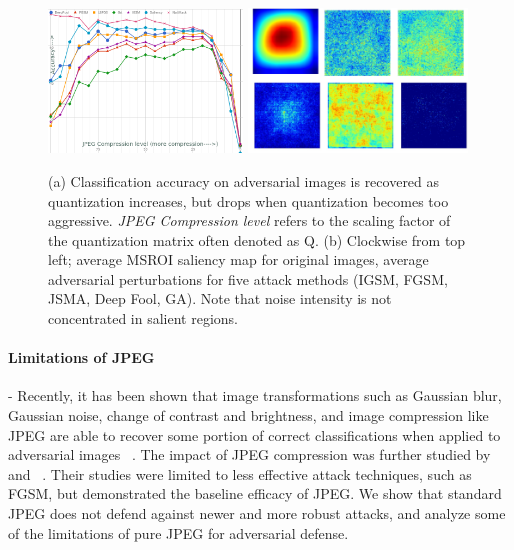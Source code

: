 \begin{figure}
    \centering
     \includegraphics[width=0.46\textwidth,angle=0]{figures/protect/jpeg_study.png}
     \includegraphics[width=0.52\textwidth,angle=0]{figures/protect/drawing_noise.jpg}
     \label{fig:jpeg}
     \caption{(a) Classification accuracy on adversarial images is recovered as quantization increases, but drops when quantization becomes too aggressive. \textit{JPEG Compression level} refers to the scaling factor of the quantization matrix often denoted as Q. (b) Clockwise from top left; average MSROI saliency map for original images, average adversarial perturbations for five attack methods (IGSM, FGSM, JSMA, Deep Fool, GA).  Note that noise intensity is not concentrated in salient regions.}
 \end{figure}



\paragraph{Limitations of JPEG} - Recently, it has been shown that image transformations such as Gaussian blur, Gaussian noise, change of contrast and brightness, and image compression like JPEG are able to recover some portion of correct classifications when applied to adversarial images ~\cite{Kurakin2016AdversarialEI}.
The impact of JPEG compression was further studied by ~\cite{Dziugaite2016ASO} and ~\cite{Das2017KeepingTB}.
Their studies were limited to less effective attack techniques, such as FGSM, but demonstrated the baseline efficacy of JPEG. 
We show that standard JPEG does not defend against newer and more robust attacks, and analyze some of the limitations of pure JPEG for adversarial defense.

